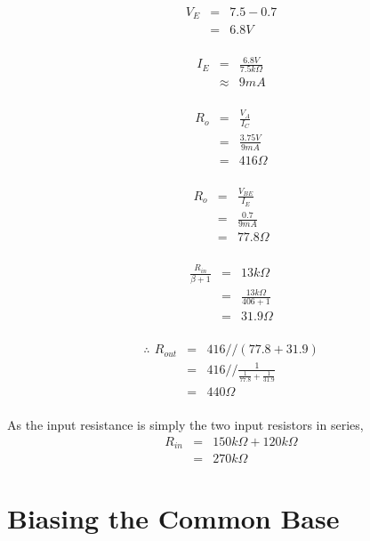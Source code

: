 \documentclass[a4paper,10pt]{report}
\begin{document}
\begin{eqnarray*}
  V_{E} & = &  7.5 - 0.7 \\
  & = & 6.8V \\
\end{eqnarray*}

\begin{eqnarray*}
  I_{E} & = & \frac{6.8V}{7.5k\Omega} \\
  & \approx & 9mA \\ 
\end{eqnarray*}

\begin{eqnarray*}
  R_{o} & = & \frac{V_{A}}{I_{C}} \\ 
  & = & \frac{3.75V}{9mA} \\
  & = & 416\Omega \\
\end{eqnarray*}

\begin{eqnarray*}
  R_{o} & = & \frac{V_{BE}}{I_{E}} \\ 
  & = & \frac{0.7}{9mA} \\
  & = & 77.8\Omega \\
\end{eqnarray*}

\begin{eqnarray*}
  \frac{R_{in}}{{\beta + 1}} & = & 13k\Omega \\ 
  & = & \frac{13k\Omega}{406+1} \\
  & = & 31.9\Omega \\
\end{eqnarray*}

\begin{eqnarray*}
  \therefore\,\  R_{out} & = & 416 // (77.8+31.9) \\
  & = & 416 // \frac{1}{\frac{1}{77.8} + \frac{1}{31.9}} \\
  & = & 440\Omega \\
\end{eqnarray*}

As the input resistance is simply the two input resistors in series,
\begin{eqnarray*}
  R_{in} & = & 150k\Omega + 120k\Omega \\
  & = & 270k\Omega
\end{eqnarray*}

\section{Biasing the Common Base}
\end{document}
